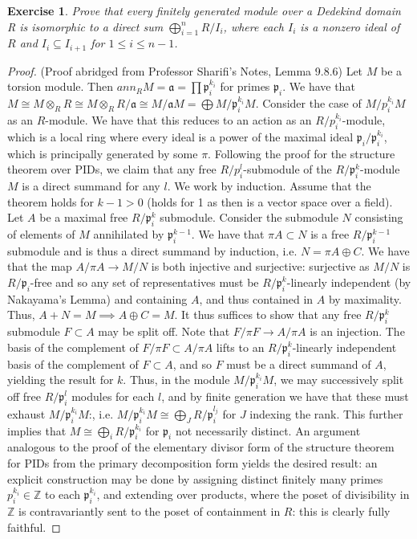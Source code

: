 \documentclass{article}
\newcommand{\bb}[1]{\mathbb{#1}}
\newcommand{\fk}[1]{\mathfrak{#1}}
\newtheorem{exercise}{Exercise}
\begin{document}
\begin{exercise}
  Prove that every finitely generated module over a Dedekind domain R is isomorphic to a direct sum $\bigoplus_{i=1}^{n}R/I_{i}$, where each $I_{i}$ is a nonzero ideal of $R$ and $I_{i} \subseteq I_{i+1}$  for $1 \leq i \leq n-1$.
\end{exercise}
\begin{proof} (Proof abridged from Professor Sharifi's Notes, Lemma 9.8.6)
  Let $M$ be a torsion module. Then $ann_{R}M = \fk{a} = \prod \fk{p}_{i}^{k_{i}}$ for primes $\fk{p}_{i}$. We have that $M \cong M \otimes_{R} R \cong M \otimes_{R} R/\fk{a} \cong M/\fk{a}M = \bigoplus M/\fk{p}_{i}^{k_{i}}M$. Consider the case of $M/p_{i}^{k_{i}}M$ as an $R$-module. We have that this reduces to an action as an $R/p_{i}^{k_{i}}$-module, which is a local ring where every ideal is a power of the maximal ideal $\fk{p}_{i}/ \fk{p}_{i}^{k_{i}}$, which is principally generated by some $\pi$. Following the proof for the structure theorem over PIDs, we claim that any free $R/p_{i}^{l}$-submodule of the $R/\fk{p}_{i}^{k}$-module $M$ is a direct summand for any $l$. We work by induction. Assume that the theorem holds for $k-1 > 0$ (holds for 1 as then is a vector space over a field). Let $A$ be a maximal free $R/\fk{p}_{i}^{k}$ submodule. Consider the submodule $N$ consisting of elements of $M$ annihilated by $\fk{p}_{i}^{k-1}$. We have that $\pi A \subset N$ is a free $R/ \fk{p}_{i}^{k-1}$ submodule and is thus a direct summand by induction, i.e. $N = \pi A \oplus C$. We have that the map $A/ \pi A \to M/N$ is both injective and surjective: surjective as $M/N$ is $R/\fk{p}_{i}$-free and so any set of representatives must be $R/\fk{p}_{i}^{k}$-linearly independent (by Nakayama's Lemma) and containing $A$, and thus contained in $A$ by maximality. Thus, $A + N = M \implies A \oplus C = M$. It thus suffices to show that any free $R/\fk{p}_{i}^{k}$ submodule $F \subset A$ may be split off. Note that $F/\pi F \to A / \pi A$ is an injection. The basis of the complement of $F/ \pi F \subset A/ \pi A$ lifts to an $R/\fk{p}_{i}^{k}$-linearly independent basis of the complement of $F \subset A$, and so $F$ must be a direct summand of $A$, yielding the result for $k$. Thus, in the module $M/\fk{p}_{i}^{k_{i}}M$, we may successively split off free $R/\fk{p}_{i}^{l}$ modules for each $l$, and by finite generation we have that these must exhaust $M/\fk{p}_{i}^{k_{i}}M$:, i.e. $M/\fk{p}_{i}^{k_{i}}M \cong \bigoplus_{J} R/\fk{p}_{i}^{l_{j}}$ for $J$ indexing the rank. This further implies that $M \cong \bigoplus_{i} R/\fk{p}_{i}^{k_{i}}$ for $\fk{p}_{i}$ not necessarily distinct. An argument analogous to the proof of the elementary divisor form of the structure theorem for PIDs from the primary decomposition form yields the desired result: an explicit construction may be done by assigning distinct finitely many primes $p_{i}^{k_{i}} \in \bb{Z}$ to each $\fk{p}_{i}^{k_{i}}$, and extending over products, where the poset of divisibility in $\mathbb{Z}$ is contravariantly sent to the poset of containment in $R$: this is clearly fully faithful.
\end{proof}
\end{document}
